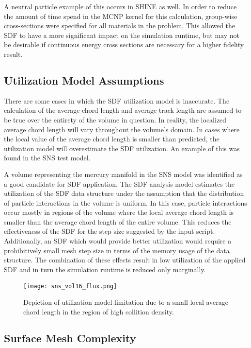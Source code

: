 A neutral particle example of this occurs in SHINE as well. In order to
reduce the amount of time spend in the MCNP kernel for this calculation,
group-wise cross-sections were specified for all materials in the problem. This
allowed the SDF to have a more significant impact on the simulation runtime, but
may not be desirable if continuous energy cross sections are necessary for a
higher fidelity result.

\subsection{Utilization Model Assumptions}\label{subsec:sdf_util_model_limits}

There are some cases in which the SDF utilization model is inaccurate. The
calculation of the average chord length and average track length are assumed to
be true over the entirety of the volume in question. In reality, the localized
average chord length will vary throughout the volume's domain. In cases where
the local value of the average chord length is smaller than predicted, the
utilization model will overestimate the SDF utilization. An example of this was
found in the SNS test model.

A volume representing the mercury manifold in the SNS model was identified as a
good candidate for SDF application. The SDF analysis model estimates the
utilization of the SDF data structure under the assumption that the distribution
of particle interactions in the volume is uniform. In this case, particle
interactions occur mostly in regions of the volume where the local average chord
length is smaller than the average chord length of the entire volume. This
reduces the effectiveness of the SDF for the step size suggested by the input
script. Additionally, an SDF which would provide better utilization would
require a prohibitively small mesh step size in terms of the memory usage of the
data structure. The combination of these effects result in low utilization of
the applied SDF and in turn the simulation runtime is reduced only marginally.

\begin{figure}
  \centering
  \texttt{[image: sns\_vol16\_flux.png]}
  \caption{Depiction of utilization model limitation due to a small local average chord length
    in the region of high collition density.}
  \label{fig:sns_low_util}
\end{figure}

\subsection{Surface Mesh Complexity}\label{subsec:sdf_tree_depth}


